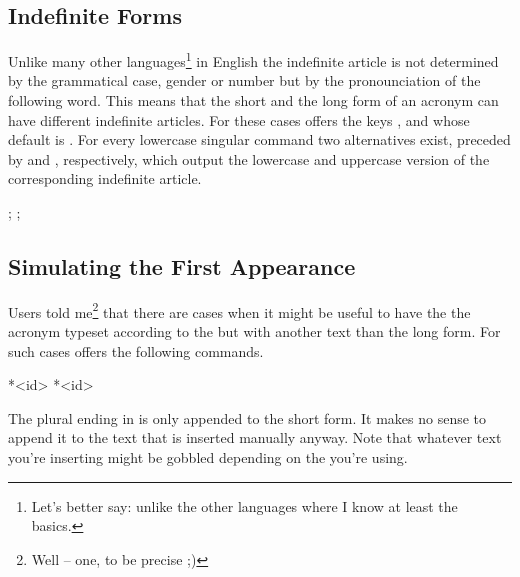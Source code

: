 \documentclass[DIV10,toc=index,toc=bib,hyperfootnotes=false]{cnpkgdoc}
\makeatletter
\newcommand*\sinceversion[1]{%
  \@bsphack
  \marginnote{%
    \footnotesize\sffamily\RaggedRight
    \textcolor{black!75}{Introduced in version~#1}}%
  \@esphack}
\makeatother
\begin{document}
\subsection{Indefinite Forms}
\noindent\sinceversion{1.2}%
Unlike many other languages\footnote{Let's better say: unlike the other
languages where I know at least the basics.} in English the indefinite article
is not determined by the grammatical case, gender or number but by the
pronounciation of the following word. This means that the short and the long
form of an acronym can have different indefinite articles. For these cases \acro
offers the keys ,  and
 whose default is . For every lowercase singular
command two alternatives exist, preceded by  and , respectively,
which output the lowercase and uppercase version of the corresponding indefinite
article.

\begin{beispiel}
 ; ; 
\end{beispiel}

\subsection{Simulating the First Appearance}
\noindent\sinceversion{1.2}%
Users told me\footnote{Well -- one, to be precise ;)} that there are cases when it
might be useful to have the the acronym typeset according to the 
but with another text than the long form. For such cases \acro offers the
following commands.
\begin{beschreibung}
 *{<id>}
 *{<id>}
\end{beschreibung}

\begin{beispiel}
\end{beispiel}

The plural ending in  is only appended to the short form. It makes
no sense to append it to the text that is inserted manually anyway. Note that
whatever text you're inserting might be gobbled depending on the 
you're using.
\end{document}
